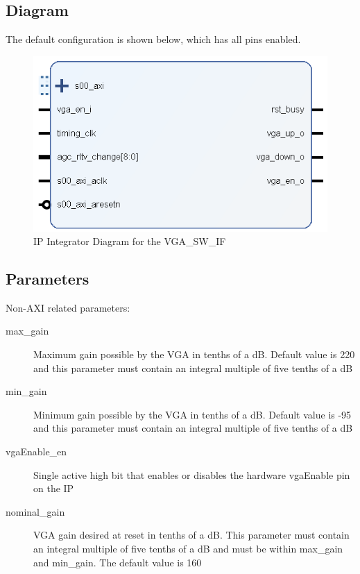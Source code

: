 \documentclass[11pt]{article}
\begin{document}
\subsection{Diagram}
The default configuration is shown below, which has all pins enabled.
\begin{figure}[H]
	\centering
	\includegraphics[width=0.4\linewidth]{images/vga_sw_if}
	\caption{IP Integrator Diagram for the VGA\_SW\_IF}
\end{figure}
\subsection{Parameters}
Non-AXI related parameters:
\begin{description}
	\item[max\_gain]Maximum gain possible by the VGA in tenths of a dB. Default value is 220 and this parameter must contain an integral multiple of
		five tenths of a dB
	\item[min\_gain]Minimum gain possible by the VGA in tenths of a dB. Default value is -95 and this parameter must contain an integral multiple of
		five tenths of a dB
	\item[vgaEnable\_en]Single active high bit that enables or disables the hardware vgaEnable pin on the IP
	\item[nominal\_gain]VGA gain desired at reset in tenths of a dB. This parameter must contain an integral multiple of
		five tenths of a dB and must be within max\_gain and min\_gain. The default value is 160 
\end{description}
\end{document}
